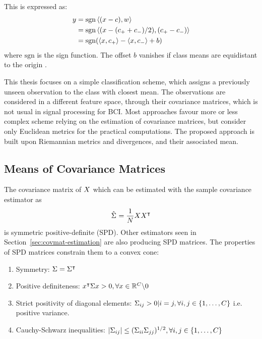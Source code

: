 This is expressed as:
\begin{equation}
\begin{split}
y &= \mathrm{sgn} \left\langle (\x-c),w \right\rangle \\
  &= \mathrm{sgn} \left\langle (\x-(c_{+}+c_{-})/2),(c_{+}-c_{-}) \right\rangle \\
  &= \mathrm{sgn} (\left\langle \x,c_{+} \right\rangle - \left\langle \x,c_{-} \right\rangle + b)
\end{split}
\label{eq:classif1}
\end{equation}
where $\mathrm{sgn}$ is the sign function.
The offset $b$ vanishes if class means are equidistant to the origin \cite{scholkopf_learning_2001}.

This thesis focuses on a simple classification scheme, which assigns a previously unseen observation to the class with closest mean.
The observations are considered in a different feature space, through their covariance matrices, which is not usual in signal processing for BCI.
Most approaches favour more or less complex scheme relying on the estimation of covariance matrices, but consider only Euclidean metrics for the practical computations.
The proposed approach is built upon Riemannian metrics and divergences, and their associated mean.

\subsection{Means of Covariance Matrices}
\label{subsec:mean}

The covariance matrix of $\X$ which can be estimated with the sample covariance estimator as
\begin{equation}
\cov{} = \frac{1}{\dt} \X \X^\intercal
\end{equation}
is symmetric positive-definite (SPD).
Other estimators seen in Section~\ref{sec:covmat-estimation} are also producing SPD matrices. 
The properties of SPD matrices constrain them to a convex cone:
\begin{enumerate}[label=(\roman*)]
\item Symmetry: $\P = \P^\intercal$
\item Positive definiteness: $\x^\intercal \P \x > 0, \forall x \in \Re^{\dc} \backslash 0$
\item Strict positivity of diagonal elements: $\P_{ij} > 0 | i=j, \forall i,j \in \left\lbrace 1, \dots, \dc \right\rbrace$ i.e. positive variance.
\item Cauchy-Schwarz inequalities: $|\P_{ij}| \leq (\P_{ii} \P_{jj})^{1/2}, \forall i,j \in \left\lbrace 1, \dots, \dc \right\rbrace$
\end{enumerate}


